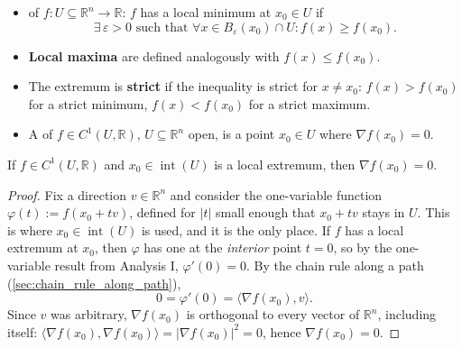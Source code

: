 \begin{definition}
\label{def:local_extrema_critical_points}
\begin{itemize}
  \item {}  of
    $f : U \subseteq \mathbb{R}^n \to \mathbb{R}$: $f$ has a local minimum at $x_0 \in U$ if
    \[\exists\,\varepsilon > 0 \text{ such that } \forall x \in B_\varepsilon(x_0)\cap U : f(x) \geq f(x_0).\]
  \item \textbf{Local maxima} are defined analogously with $f(x) \leq f(x_0)$.
  \item The extremum is \textbf{strict} if the inequality is strict for $x \neq x_0$:
    $f(x) > f(x_0)$ for a strict minimum, $f(x) < f(x_0)$ for a strict maximum.
  \item A   of $f \in C^1(U,\mathbb{R})$,
    $U \subseteq \mathbb{R}^n$ open, is a point $x_0 \in U$ where $\nabla f(x_0) = 0$.
\end{itemize}
\end{definition}

\begin{proposition}
\label{prop:extremum_implies_critical}
If $f \in C^1(U,\mathbb{R})$ and $x_0 \in \operatorname{int}(U)$ is a local extremum, then
$\nabla f(x_0) = 0$.
\end{proposition}

\begin{proof}
Fix a direction $v \in \mathbb{R}^n$ and consider the one-variable function
$\varphi(t) := f(x_0 + tv)$, defined for $|t|$ small enough that $x_0 + tv$ stays in $U$. This is
where $x_0 \in \operatorname{int}(U)$ is used, and it is the only place. If $f$ has a local
extremum at $x_0$, then $\varphi$ has one at the \emph{interior} point $t=0$, so by the
one-variable result from Analysis I, $\varphi'(0) = 0$. By the chain rule along a path
(\cref{sec:chain_rule_along_path}),
\[0 = \varphi'(0) = \langle \nabla f(x_0), v\rangle.\]
Since $v$ was arbitrary, $\nabla f(x_0)$ is orthogonal to every vector of $\mathbb{R}^n$,
including itself: $\langle\nabla f(x_0),\nabla f(x_0)\rangle = |\nabla f(x_0)|^2 = 0$, hence
$\nabla f(x_0) = 0$.
\end{proof}

